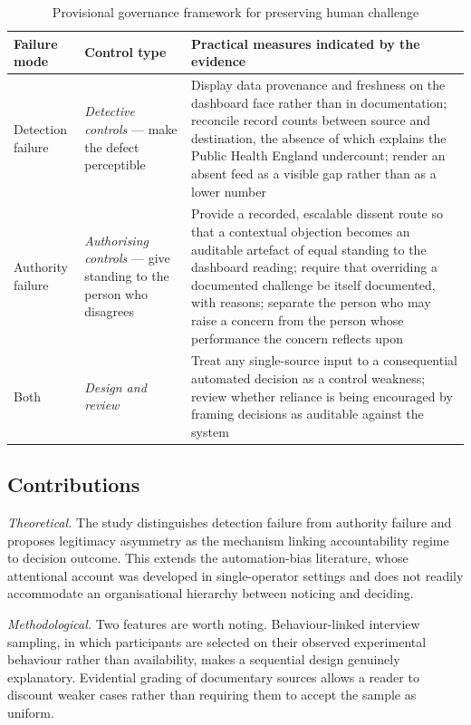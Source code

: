 \documentclass[11pt,a4paper]{article}
\numberwithin{figure}{section}
\numberwithin{table}{section}
\begin{document}
\begin{table}[H]
\centering\footnotesize
\caption{Provisional governance framework for preserving human challenge}
\label{tab:gov}
\begin{tabularx}{\textwidth}{@{}p{2.6cm} p{3.5cm} X@{}}
\toprule
\textbf{Failure mode} & \textbf{Control type} & \textbf{Practical measures indicated by the evidence} \\
\midrule
Detection failure & \emph{Detective controls} --- make the defect perceptible & Display data provenance and
freshness on the dashboard face rather than in documentation; reconcile record counts between source and
destination, the absence of which explains the Public Health England undercount; render an absent feed as a
visible gap rather than as a lower number \\
\addlinespace
Authority failure & \emph{Authorising controls} --- give standing to the person who disagrees & Provide a
recorded, escalable dissent route so that a contextual objection becomes an auditable artefact of equal
standing to the dashboard reading; require that overriding a documented challenge be itself documented, with
reasons; separate the person who may raise a concern from the person whose performance the concern reflects
upon \\
\addlinespace
Both & \emph{Design and review} & Treat any single-source input to a consequential automated decision as a
control weakness; review whether reliance is being encouraged by framing decisions as auditable against the
system \\
\bottomrule
\end{tabularx}
\end{table}

\subsection{Contributions}

\emph{Theoretical.} The study distinguishes detection failure from authority failure and proposes
legitimacy asymmetry as the mechanism linking accountability regime to decision outcome. This extends the
automation-bias literature, whose attentional account was developed in single-operator settings and does not
readily accommodate an organisational hierarchy between noticing and deciding.

\emph{Methodological.} Two features are worth noting. Behaviour-linked interview sampling, in which
participants are selected on their observed experimental behaviour rather than availability, makes a
sequential design genuinely explanatory. Evidential grading of documentary sources allows a reader to
discount weaker cases rather than requiring them to accept the sample as uniform.
\end{document}
